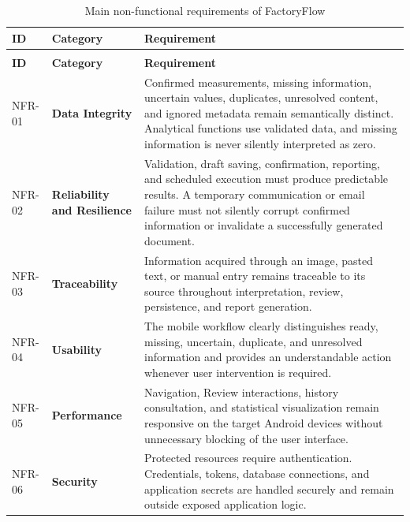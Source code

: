 \begin{longtable}{
    |>{\centering\arraybackslash\bfseries}p{}
    |>{\raggedright\arraybackslash\bfseries}p{}
    |>{\raggedright\arraybackslash}p{}|
}

\caption{Main non-functional requirements of FactoryFlow}
\label{tab:non-functional-requirements}
\\

\hline
\textbf{ID} & \textbf{Category} & \textbf{Requirement}
\\
\hline
\endfirsthead

\multicolumn{3}{c}{
    \textit{Table~\ref{tab:non-functional-requirements} -- continued}
}
\\[4pt]

\hline
\textbf{ID} & \textbf{Category} & \textbf{Requirement}
\\
\hline
\endhead

NFR-01
&
Data Integrity
&
Confirmed measurements, missing information, uncertain values, duplicates,
unresolved content, and ignored metadata remain semantically distinct.
Analytical functions use validated data, and missing information is never
silently interpreted as zero.
\\
\hline

NFR-02
&
Reliability and Resilience
&
Validation, draft saving, confirmation, reporting, and scheduled execution
must produce predictable results. A temporary communication or email failure
must not silently corrupt confirmed information or invalidate a successfully
generated document.
\\
\hline

NFR-03
&
Traceability
&
Information acquired through an image, pasted text, or manual entry remains
traceable to its source throughout interpretation, review, persistence, and
report generation.
\\
\hline

NFR-04
&
Usability
&
The mobile workflow clearly distinguishes ready, missing, uncertain,
duplicate, and unresolved information and provides an understandable action
whenever user intervention is required.
\\
\hline

NFR-05
&
Performance
&
Navigation, Review interactions, history consultation, and statistical
visualization remain responsive on the target Android devices without
unnecessary blocking of the user interface.
\\
\hline

NFR-06
&
Security
&
Protected resources require authentication. Credentials, tokens, database
connections, and application secrets are handled securely and remain outside
exposed application logic.
\\
\hline


\end{longtable}
